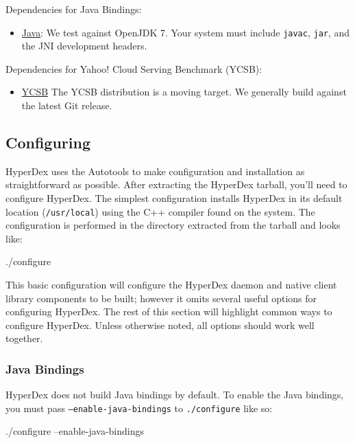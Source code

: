 Dependencies for Java Bindings:

\begin{itemize}
\item \href{http://openjdk.java.net/}{Java}: We test against OpenJDK 7.  Your
    system must include \texttt{javac}, \texttt{jar}, and the JNI development
    headers.
\end{itemize}

Dependencies for Yahoo! Cloud Serving Benchmark (YCSB):

\begin{itemize}
\item \href{https://github.com/brianfrankcooper/YCSB/wiki}{YCSB} The YCSB
    distribution is a moving target.  We generally build against the latest Git
    release.
\end{itemize}

\subsection{Configuring}
\label{sec:installation:source:configure}

HyperDex uses the Autotools to make configuration and installation as
straightforward as possible.  After extracting the HyperDex tarball, you'll need
to configure HyperDex.  The simplest configuration installs HyperDex in its
default location (\texttt{/usr/local}) using the C++ compiler found on the
system.  The configuration is performed in the directory extracted from the
tarball and looks like:

\begin{consolecode}
./configure
\end{consolecode}

This basic configuration will configure the HyperDex daemon and native client
library components to be built; however it omits several useful options for
configuring HyperDex.  The rest of this section will highlight common ways to
configure HyperDex.  Unless otherwise noted, all options should work well
together.

\subsubsection{Java Bindings}
\label{sec:installation:source:java}

HyperDex does not build Java bindings by default.  To enable the Java bindings,
you must pass \texttt{--enable-java-bindings} to \texttt{./configure} like so:

\begin{consolecode}
./configure --enable-java-bindings
\end{consolecode}

